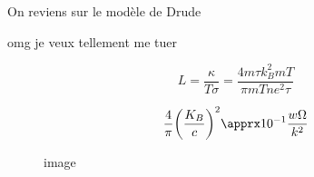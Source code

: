 



On reviens sur le modèle de Drude

omg je veux tellement me tuer

$$L = \frac{\kappa}{T\sigma} =\frac{4m \tau k_{B}^2 mT}{\pi m T ne^2 \tau}$$

$$\frac{4}{\pi}  \qty(\frac{K_{B}}{c} )^2 \apprx 10^{-1} \frac{w\Omega}{k^2} $$ 

\begin{figure}[ht]
    \centering
    \caption{image}
    \label{fig:image}
\end{figure}


